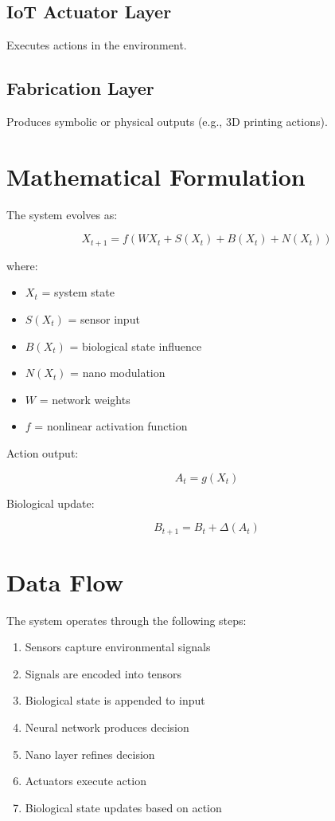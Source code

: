 \documentclass[12pt]{article}
\begin{document}
\subsection{IoT Actuator Layer}
Executes actions in the environment.

\subsection{Fabrication Layer}
Produces symbolic or physical outputs (e.g., 3D printing actions).

\section{Mathematical Formulation}

The system evolves as:

\[
X_{t+1} = f(WX_t + S(X_t) + B(X_t) + N(X_t))
\]

where:

\begin{itemize}
\item $X_t$ = system state
\item $S(X_t)$ = sensor input
\item $B(X_t)$ = biological state influence
\item $N(X_t)$ = nano modulation
\item $W$ = network weights
\item $f$ = nonlinear activation function
\end{itemize}

Action output:

\[
A_t = g(X_t)
\]

Biological update:

\[
B_{t+1} = B_t + \Delta(A_t)
\]

\section{Data Flow}

The system operates through the following steps:

\begin{enumerate}
\item Sensors capture environmental signals
\item Signals are encoded into tensors
\item Biological state is appended to input
\item Neural network produces decision
\item Nano layer refines decision
\item Actuators execute action
\item Biological state updates based on action
\end{enumerate}
\end{document}
